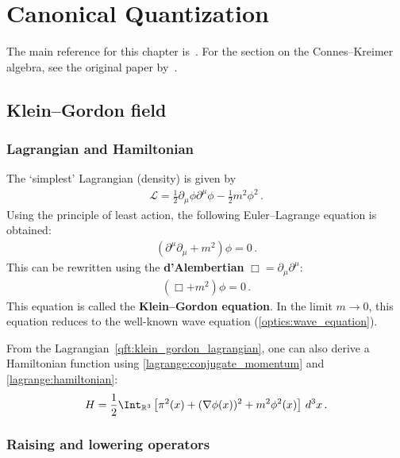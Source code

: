 \chapter{Canonical Quantization}

    The main reference for this chapter is~\citet{peskin_introduction_1995}. For the section on the Connes--Kreimer algebra, see the original paper by~\citet{connes_hopf_1998}.

\section{Klein--Gordon field}
\subsection{Lagrangian and Hamiltonian}

    The `simplest' Lagrangian (density) is given by
    \begin{gather}
        \label{qft:klein_gordon_lagrangian}
        \mathcal{L} = \frac{1}{2}\partial_\mu\phi\partial^\mu\phi - \frac{1}{2}m^2\phi^2\,.
    \end{gather}
    Using the principle of least action, the following Euler--Lagrange equation is obtained:
    \begin{gather}
        \left(\partial^\mu\partial_\mu + m^2\right)\phi = 0\,.
    \end{gather}
    This can be rewritten using the \textbf{d'Alembertian} $\Box = \partial_\mu\partial^\mu$:
    \begin{gather}
        \label{qft:klein_gordon_equation}
        (\Box+m^2)\phi = 0\,.
    \end{gather}
    This equation is called the \textbf{Klein--Gordon equation}. In the limit $m\longrightarrow0$, this equation reduces to the well-known wave equation (\cref{optics:wave_equation}).

    From the Lagrangian~\eqref{qft:klein_gordon_lagrangian}, one can also derive a Hamiltonian function using \cref{lagrange:conjugate_momentum} and \cref{lagrange:hamiltonian}:
    \begin{gather}
        \label{qft:klein_gordon_hamiltonian}
        H = \frac{1}{2}\Int_{\mathbb{R}^3}\left[\pi^2(x) + (\nabla\phi(x))^2 + m^2\phi^2(x)\right]\,d^3x\,.
    \end{gather}

\subsection{Raising and lowering operators}

